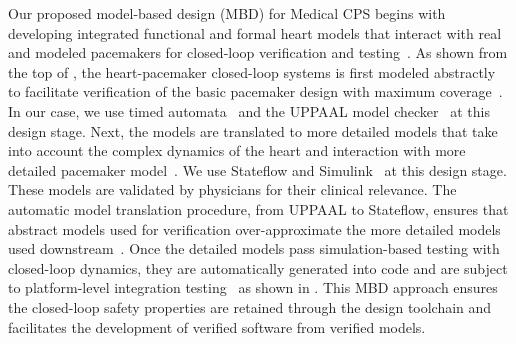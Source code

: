 Our proposed model-based design (MBD) for Medical CPS begins with developing integrated functional and formal heart models that interact with real and modeled pacemakers for closed-loop verification and testing~\cite{vhm_proc}. As shown from the top of , the heart-pacemaker closed-loop systems is first modeled abstractly to facilitate verification of the basic pacemaker design with maximum coverage~\cite{vhm_tacas12}. In our case, we use timed automata~\cite{timed_automata, timed-aut} and the UPPAAL model checker~\cite{BDL04, uppaal, uppaal_tut} at this design stage. Next, the models are translated to more detailed models that take into account the complex dynamics of the heart and interaction with more detailed pacemaker model~\cite{vhm_ecrts10, vhm_embc11,vhm_iccps11}. We use Stateflow and Simulink~\cite{stateflow, volkswagen} at this design stage. These models are validated by physicians for their clinical relevance. The automatic model translation procedure, from UPPAAL to Stateflow, ensures that abstract models used for verification over-approximate the more detailed models used downstream~\cite{vhm_rtas12}. Once the detailed models pass simulation-based testing with closed-loop dynamics, they are automatically generated into code and are subject to platform-level integration testing~\cite{vhm_website} as shown in . This MBD approach ensures the closed-loop safety properties are retained through the design toolchain and facilitates the development of verified software from verified models.\vspace{4pt}

